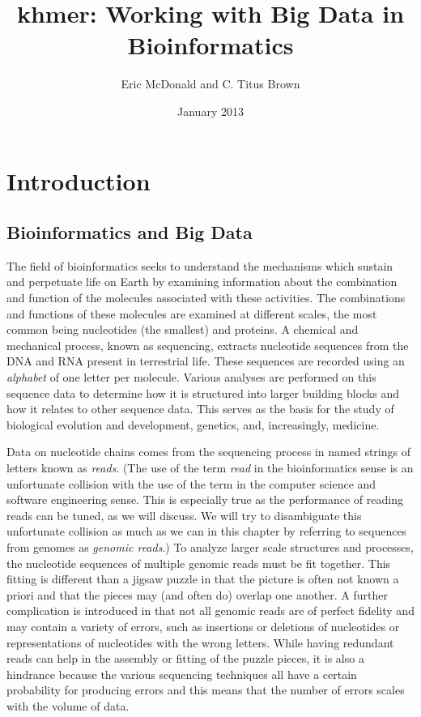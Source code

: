 \documentclass{article}
\title{khmer: Working with Big Data in Bioinformatics}
\author{Eric McDonald and C. Titus Brown}
\date{January 2013}
\begin{document}
\maketitle

\section{Introduction}

\subsection{Bioinformatics and Big Data}

The field of bioinformatics seeks to understand the mechanisms which sustain 
and perpetuate life on Earth by examining information about the combination and
function of the molecules associated with these activities. The combinations
and functions of these molecules are examined at different scales, the most
common being nucleotides (the smallest) and proteins. A chemical and mechanical
process, known as sequencing, extracts nucleotide sequences from the DNA and
RNA present in terrestrial life. These sequences are recorded using an
\textit{alphabet} of one letter per molecule. Various analyses are performed on
this sequence data to determine how it is structured into larger building
blocks and how it relates to other sequence data. This serves as the basis for
the study of biological evolution and development, genetics, and, increasingly,
medicine.

Data on nucleotide chains comes from the sequencing process in named strings of
letters known as \textit{reads}. (The use of the term \textit{read} in the
bioinformatics sense is an unfortunate collision with the use of the term in
the computer science and software engineering sense. This is especially true as
the performance of reading reads can be tuned, as we will discuss. We will try
to disambiguate this unfortunate collision as much as we can in this chapter by
referring to sequences from genomes as \textit{genomic reads}.) To analyze
larger scale structures and processes, the nucleotide sequences of multiple
genomic reads must be fit together. This fitting is different than a jigsaw
puzzle in that the picture is often not known a priori and that the pieces may
(and often do) overlap one another. A further complication is introduced in
that not all genomic reads are of perfect fidelity and may contain a variety of
errors, such as insertions or deletions of nucleotides or representations of
nucleotides with the wrong letters. While having redundant reads can help in
the assembly or fitting of the puzzle pieces, it is also a hindrance because
the various sequencing techniques all have a certain probability for producing
errors and this means that the number of errors scales with the volume of data.
\end{document}
